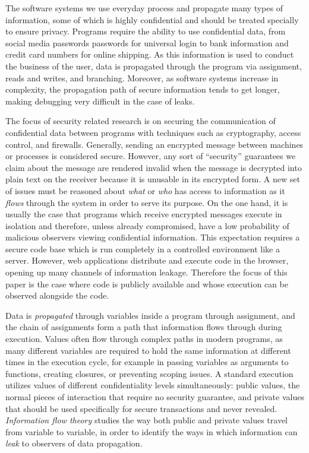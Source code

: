 \documentclass[preprint]{sigplanconf}
\begin{document}
The software systems we use everyday process and propagate many types of information, some of which is highly confidential and should be treated specially to ensure privacy. Programs require the ability to use confidential data, from social media passwords passwords for universal login to bank information and credit card numbers for online shipping. As this information is used to conduct the business of the user, data is propagated through the program via assignment, reads and writes, and branching. Moreover, as software systems increase in complexity, the propagation path of secure information tends to get longer, making debugging very difficult in the case of leaks.

The focus of security related research is on securing the communication of confidential data between programs with techniques such as cryptography, access control, and firewalls. Generally, sending an encrypted message between machines or processes is considered secure. However, any sort of ``security'' guarantees we claim about the message are rendered invalid when the message is decrypted into plain text on the receiver because it is unusable in its encrypted form. A new set of issues must be reasoned about \textit{what} or \textit{who} has access to information as it \textit{flows} through the system in order to serve its purpose. On the one hand, it is usually the case that programs which receive encrypted messages execute in isolation and therefore, unless already compromised, have a low probability of malicious observers viewing confidential information. This expectation requires a secure code base which is run completely in a controlled environment like a server. However, web applications distribute and execute code in the browser, opening up many channels of information leakage. Therefore the focus of this paper is the case where code is publicly available and whose execution can be observed alongside the code.

Data is \textit{propagated} through variables inside a program through assignment, and the chain of assignments form a path that information flows through during execution. Values often flow through complex paths in modern programs, as many different variables are required to hold the same information at different times in the execution cycle, for example in passing variables as arguments to functions, creating closures, or preventing scoping issues. A standard execution utilizes values of different confidentiality levels simultaneously: public values, the normal pieces of interaction that require no security guarantee, and private values that should be used specifically for secure transactions and never revealed. \textit{Information flow theory} studies the way both public and private values travel from variable to variable, in order to identify the ways in which information can \textit{leak} to observers of data propagation.
\end{document}
